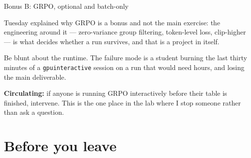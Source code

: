 \documentclass[aspectratio=169,10pt]{beamer}
\begin{document}
\begin{frame}[shrink=14]{Bonus B: GRPO, optional and batch-only}
{  Tuesday explained why GRPO is a bonus and not the main exercise: the
  engineering around it --- zero-variance group filtering, token-level loss,
  clip-higher --- is what decides whether a run survives, and that is a project
  in itself.

  Be blunt about the runtime. The failure mode is a student burning the last
  thirty minutes of a \texttt{gpuinteractive} session on a run that would need
  hours, and losing the main deliverable.

  \textbf{Circulating:} if anyone is running GRPO interactively before their
  table is finished, intervene. This is the one place in the lab where I stop
  someone rather than ask a question.}
\end{frame}

\fi
\section{Before you leave}
\end{document}
